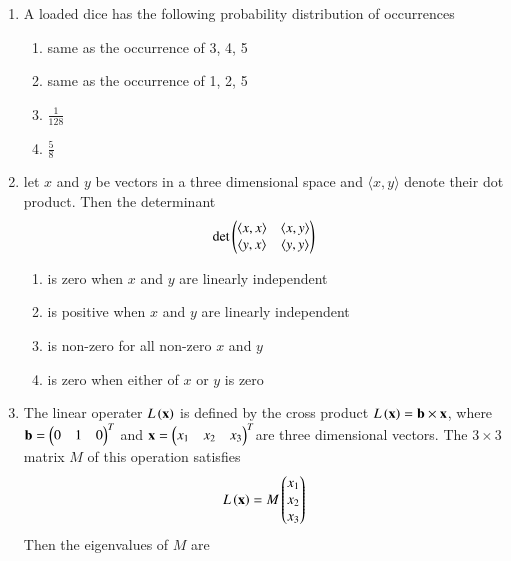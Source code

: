 \documentclass[journal]{IEEEtran}
\numberwithin{equation}{enumi}
\numberwithin{figure}{enumi}
\begin{document}
\begin{enumerate}
    \item 
    A loaded dice has the following probability distribution of occurrences

    \begin{table}[h!]    
      \centering
      
    \end{table}
    \hfill{}
    \begin{enumerate}
        \item same as the occurrence of 3, 4, 5
        \item same as the occurrence of 1, 2, 5
        \item $\frac{1}{128}$
        \item $\frac{5}{8}$
    \end{enumerate}

    \item 
    let $x$ and $y$ be vectors in a three dimensional space and $\langle x,y\rangle$ denote their dot product. Then the determinant 
    \begin{align*}
        \text{det}\begin{pmatrix}\langle x,x\rangle & \langle x,y\rangle \\ \langle y,x\rangle & \langle y,y\rangle\end{pmatrix} 
    \end{align*}
    \hfill{}
    \begin{enumerate}
        \item is zero when $x$ and $y$ are linearly independent
        \item is positive when $x$ and $y$ are linearly independent
        \item is non-zero for all  non-zero $x$ and $y$
        \item is zero when either of $x$ or $y$ is zero
    \end{enumerate}

    \item 
    The linear operater $L\left(\mathbf{x}\right)$ is defined by the cross product $L\left(\mathbf{x}\right) = \mathbf{b} \times \mathbf{x}$, where $\mathbf{b} = \begin{pmatrix}0 & 1 & 0\end{pmatrix}^{T}$ and $\mathbf{x} = \begin{pmatrix}x_1 & x_2 & x_3\end{pmatrix}^{T}$are three dimensional vectors. The $3 \times 3$ matrix $M$ of this operation satisfies 
    \begin{align*}
        L\left(\mathbf{x}\right) = M\begin{pmatrix}x_1 \\ x_2 \\ x_3\end{pmatrix}
    \end{align*}
    Then the eigenvalues of $M$ are
    \hfill{}
    \begin{enumerate}
    \end{enumerate}


\end{enumerate}
\end{document}
